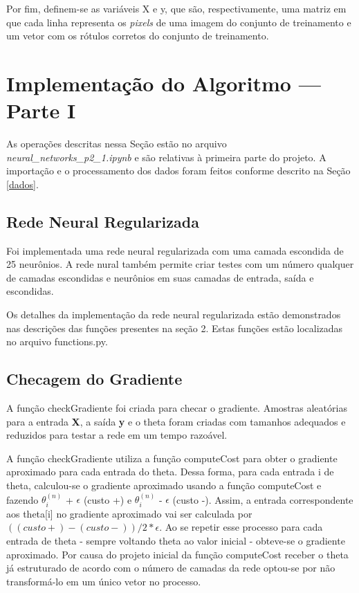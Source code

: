 \documentclass[12pt]{article}
\begin{document}
Por fim, definem-se as variáveis X e y, que são, respectivamente, uma matriz em que cada linha representa os \textit{pixels} de uma imagem do conjunto de treinamento e um vetor com os rótulos corretos do conjunto de treinamento.

\section{Implementação do Algoritmo --- Parte I} \label{parte1}
As operações descritas nessa Seção estão no arquivo \textit{neural\_networks\_p2\_1.ipynb} e são relativas à primeira parte do projeto. A importação e o processamento dos dados foram feitos conforme descrito na Seção \ref{dados}.

\subsection{Rede Neural Regularizada}

Foi implementada uma rede neural regularizada com uma camada escondida de 25 neurônios. A rede nural também permite criar testes com um número qualquer de camadas escondidas e neurônios em suas camadas de entrada, saída e escondidas. 

Os detalhes da implementação da rede neural regularizada estão demonstrados nas descrições das funções presentes na seção 2. Estas funções estão localizadas no arquivo functions.py.


\subsection{Checagem do Gradiente}

A função checkGradiente foi criada para checar o gradiente. Amostras aleatórias para a entrada \textbf{X}, a saída \textbf{y} e o theta foram criadas com tamanhos adequados e reduzidos para testar a rede em um tempo razoável.

A função checkGradiente utiliza a função computeCost para obter o gradiente aproximado para cada entrada do theta. Dessa forma, para cada entrada i de theta, calculou-se o gradiente aproximado usando a função computeCost e fazendo $\theta^{(n)}_{i}$ + $\epsilon$ (custo +) e $\theta^{(n)}_{i}$ - $\epsilon$ (custo -). Assim, a entrada correspondente aos theta[i] no gradiente aproximado vai ser calculada por $((custo+) - (custo-))/2*\epsilon$. Ao se repetir esse processo para cada entrada de theta - sempre voltando theta ao valor inicial - obteve-se o gradiente aproximado. Por causa do projeto inicial da função computeCost receber o theta já estruturado de acordo com o número de camadas da rede optou-se por não transformá-lo em um único vetor no processo.
\end{document}
